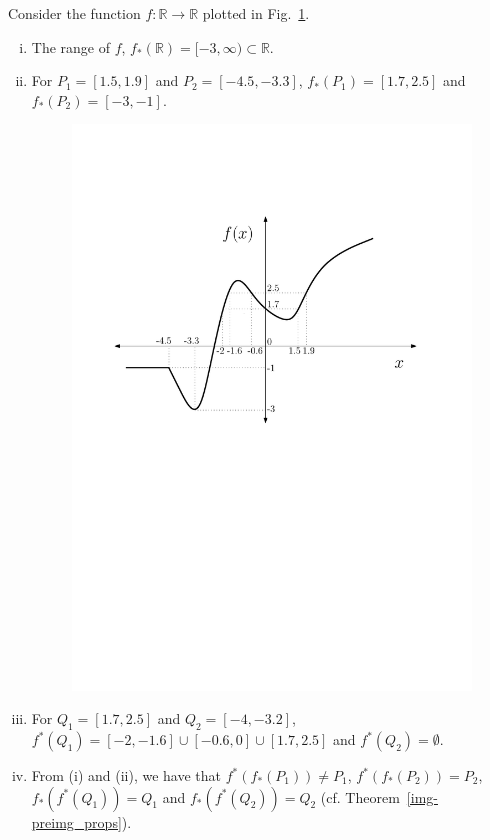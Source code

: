 \documentclass[a4paper,english,12pt]{article}
\begin{document}
\begin{exmp}
Consider the function $f:\mathbb{R}\rightarrow \mathbb{R}$ plotted in Fig.~\ref{func_ex}.\begin{enumerate}[i)]
\item The range of $f$, $f_*(\mathbb{R})=[-3,\infty)\subset \mathbb{R}$.
\item For $P_1=[1.5,1.9]$ and $P_2=[-4.5,-3.3]$, $f_*(P_1)=[1.7,2.5]$ and $f_*(P_2)=[-3,-1]$.
\begin{figure}[h]
\centering
\includegraphics[scale=0.6]{Figures/l5f2_graph.pdf}
\caption{}
\label{func_ex}
\end{figure}
\item For $Q_1=[1.7,2.5]$ and $Q_2=[-4,-3.2]$, $f^*(Q_1)= [-2,-1.6] \cup [-0.6,0] \cup [1.7,2.5]$ and $f^*(Q_2)=\emptyset$.
\item From (i) and (ii), we have that $f^*(f_*(P_1))\neq P_1$, $f^*(f_*(P_2))=P_2$, $f_*(f^*(Q_1))=Q_1$ and $f_*(f^*(Q_2))=Q_2$ (cf. Theorem~\ref{img-preimg_props}).
\end{enumerate}
\end{exmp}
\end{document}
